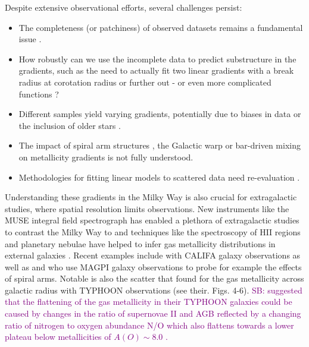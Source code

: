 \documentclass[fleqn,usenatbib]{mnras}
\newcommand{\SB}[1]{{\textcolor{purple}{SB: #1}}}
\begin{document}
Despite extensive observational efforts, several challenges persist:
\begin{itemize}
    \item The completeness (or patchiness) of observed datasets remains a fundamental issue \citep{Bergemann2014}.
    \item How robustly can we use the incomplete data to predict substructure in the gradients, such as the need to actually fit two linear gradients with a break radius at corotation radius \citep[][and references therein]{Bresolin2012} or further out \citep{Yong2012, Donor2020} - or even more complicated functions \citep[see e.g.][]{Chiappini2001, Kubryk2015}?
    \item Different samples yield varying gradients, potentially due to biases in data or the inclusion of older stars \citep[e.g.][]{Boeche2013, AllendePrieto2006, Katz2011, Hayden2014, Anders2014, Vickers2021, Willett2023}.
    \item The impact of spiral arm structures \citep{Poggio2021}, the Galactic warp \citep{Lemasle2022} or bar-driven mixing \citep{DiMatteo2013} on metallicity gradients is not fully understood.
    \item Methodologies for fitting linear models to scattered data need re-evaluation \citep{Metha2021}.
\end{itemize}

Understanding these gradients in the Milky Way is also crucial for extragalactic studies, where spatial resolution limits observations. New instruments like the MUSE integral field spectrograph has enabled a plethora of extragalactic studies to contrast the Milky Way to and techniques like the spectroscopy of HII regions and planetary nebulae have helped to infer gas metallicity distributions in external galaxies \citep{Shaver1983, Vilchez1996, Rolleston2000, Bresolin2012}. Recent examples include \citet{Sanchez2014} with CALIFA galaxy observations as well as \citet{Mun2024} and \citet{Chen2024} who use MAGPI galaxy observations to probe for example the effects of spiral arms. Notable is also the scatter that \citet{Chen2023} found for the gas metallicity across galactic radius with TYPHOON observations (see their. Figs. 4-6). \SB{\citet{Grasha2022} suggested that the flattening of the gas metallicity in their TYPHOON galaxies could be caused by changes in the ratio of supernovae II and AGB reflected by a changing ratio of nitrogen to oxygen abundance N/O which also flattens towards a lower plateau below metallicities of $A(O) \sim 8.0$ \citep{Nicholls2017}.}
\end{document}
